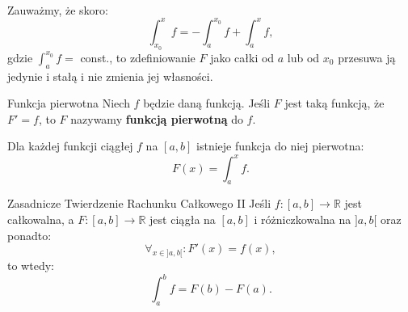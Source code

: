 \documentclass{article}
\newcounter{defi}
\numberwithin{defi}{section}
\numberwithin{defi}{section}
\newcommand{\R}{\mathbb{R}}
\newcommand{\tb}[1]{\textbf{#1}}
\begin{document}
\paragraph{} Zauważmy, że skoro: \begin{equation}
    \int_{x_0}^{x} f = -\int_{a}^{x_0} f + \int_{a}^{x}f,
\end{equation} gdzie $\int_{a}^{x_0} f = $ const., to zdefiniowanie $F$ jako całki od $a$ lub od $x_0$ przesuwa ją jedynie i stałą i nie zmienia jej własności.

\begin{defr}{Funkcja pierwotna}
    Niech $f$ będzie daną funkcją. Jeśli $F$ jest taką funkcją, że $F' = f$, to $F$ nazywamy \tb{funkcją pierwotną} do $f$.
\end{defr}

\begin{obs}{}
    Dla każdej funkcji ciągłej $f$ na $[a, b]$ istnieje funkcja do niej pierwotna: \begin{equation}
        F(x) = \int_{a}^{x} f.
    \end{equation}
\end{obs}

\begin{twier}[label=twier:ZTRCII]{Zasadnicze Twierdzenie Rachunku Całkowego II}
    Jeśli $f: [a, b] \to \R$ jest całkowalna, a $F: [a, b] \to \R$ jest ciągła na $[a, b]$ i różniczkowalna na $]a, b[$ oraz ponadto: \begin{equation}
        \forall_{x \in ]a, b[ }: F'(x) = f(x),
    \end{equation} to wtedy: \begin{equation}
        \int_{a}^{b} f = F(b) - F(a).
    \end{equation}
\end{twier}
\end{document}
